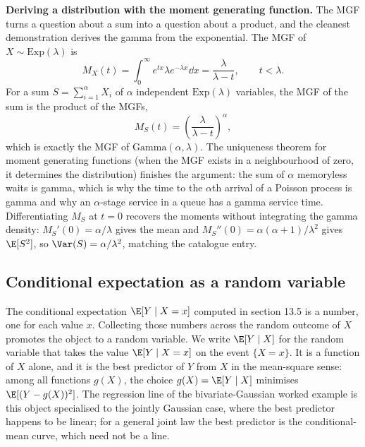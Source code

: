 \begin{mastery}
\textbf{Deriving a distribution with the moment generating function.}
The MGF turns a question about a sum into a question about a product,
and the cleanest demonstration derives the gamma from the
exponential. The MGF of $X \sim \mathrm{Exp}(\lambda)$ is
\[
M_{X}(t) = \int_{0}^{\infty} e^{tx} \lambda e^{-\lambda x} \dd x
= \frac{\lambda}{\lambda - t}, \qquad t < \lambda.
\]
For a sum $S = \sum_{i=1}^{\alpha} X_{i}$ of $\alpha$ independent
$\mathrm{Exp}(\lambda)$ variables, the MGF of the sum is the product
of the MGFs,
\[
M_{S}(t) = \left( \frac{\lambda}{\lambda - t} \right)^{\alpha},
\]
which is exactly the MGF of $\mathrm{Gamma}(\alpha, \lambda)$. The
uniqueness theorem for moment generating functions (when the MGF
exists in a neighbourhood of zero, it determines the distribution)
finishes the argument: the sum of $\alpha$ memoryless waits is gamma,
which is why the time to the $\alpha$th arrival of a Poisson process
is gamma and why an $\alpha$-stage service in a queue has a gamma
service time. Differentiating $M_{S}$ at $t = 0$ recovers the moments
without integrating the gamma density: $M_{S}'(0) = \alpha/\lambda$
gives the mean and $M_{S}''(0) = \alpha(\alpha+1)/\lambda^{2}$ gives
$\E[S^{2}]$, so $\Var(S) = \alpha/\lambda^{2}$, matching the catalogue
entry.
\end{mastery}

\subsection{Conditional expectation as a random variable}

The conditional expectation $\E[Y \mid X = x]$ computed in section 13.5
is a number, one for each value $x$. Collecting those numbers across the
random outcome of $X$ promotes the object to a random variable. We write
$\E[Y \mid X]$ for the random variable that takes the value $\E[Y \mid
X = x]$ on the event $\{X = x\}$. It is a function of $X$ alone, and it
is the best predictor of $Y$ from $X$ in the mean-square sense: among all
functions $g(X)$, the choice $g(X) = \E[Y \mid X]$ minimises
$\E[(Y - g(X))^{2}]$. The regression line of the bivariate-Gaussian
worked example is this object specialised to the jointly Gaussian case,
where the best predictor happens to be linear; for a general joint law
the best predictor is the conditional-mean curve, which need not be a
line.

